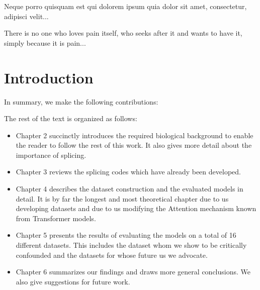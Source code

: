 \begin{savequote}[8cm]
\textlatin{Neque porro quisquam est qui dolorem ipsum quia dolor sit amet, consectetur, adipisci velit...}

There is no one who loves pain itself, who seeks after it and wants to have it, simply because it is pain...
\end{savequote}

\chapter{\label{ch:1-intro}Introduction} 




In summary, we make the following contributions:


The rest of the text is organized as follows:
\begin{itemize}
	\item Chapter 2 succinctly introduces the required biological background to enable the reader to follow the rest of this work. It also gives more detail about the importance of splicing.
	\item Chapter 3 reviews the splicing codes which have already been developed.
	\item Chapter 4 describes the dataset construction and the evaluated models in detail. It is by far the longest and most theoretical chapter due to us developing datasets and due to us modifying the Attention mechanism known from Transformer models.
	\item Chapter 5 presents the results of evaluating the models on a total of 16 different datasets. This includes the dataset whom we show to be critically confounded and the datasets for whose future us we advocate.
	\item Chapter 6 summarizes our findings and draws more general conclusions. We also give suggestions for future work.
\end{itemize}

%
%



